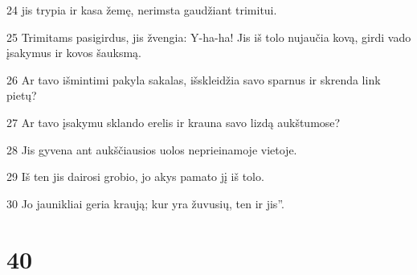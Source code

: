 \par 24 jis trypia ir kasa žemę, nerimsta gaudžiant trimitui. 
\par 25 Trimitams pasigirdus, jis žvengia: Y-ha-ha! Jis iš tolo nujaučia kovą, girdi vado įsakymus ir kovos šauksmą. 
\par 26 Ar tavo išmintimi pakyla sakalas, išskleidžia savo sparnus ir skrenda link pietų? 
\par 27 Ar tavo įsakymu sklando erelis ir krauna savo lizdą aukštumose? 
\par 28 Jis gyvena ant aukščiausios uolos neprieinamoje vietoje. 
\par 29 Iš ten jis dairosi grobio, jo akys pamato jį iš tolo. 
\par 30 Jo jaunikliai geria kraują; kur yra žuvusių, ten ir jis”.



\chapter{40}


